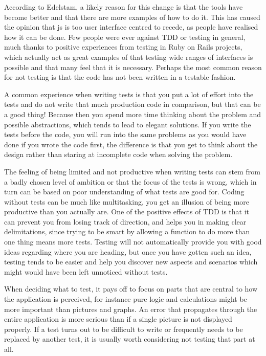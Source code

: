 \documentclass[11pt]{article}
\begin{document}
According to Edelstam, a likely reason for this change is that the tools have become better and that there are more examples of how to do it. This has caused the opinion that \gls{js} is too user interface centred to recede, as people have realised how it can be done. Few people were ever against TDD or testing in general, much thanks to positive experiences from testing in Ruby on Rails projects, which actually act as great examples of that testing wide ranges of interfaces is possible and that many feel that it is necessary. Perhaps the most common reason for not testing is that the code has not been written in a testable fashion. \cite[questions~2-3]{Edelstam}

A common experience when writing tests is that you put a lot of effort into the tests and do not write that much production code in comparison, but that can be a good thing! Because then you spend more time thinking about the problem and possible abstractions, which tends to lead to elegant solutions. If you write the tests before the code, you will run into the same problems as you would have done if you wrote the code first, the difference is that you get to think about the design rather than staring at incomplete code when solving the problem. \cite[question~8]{Edelstam}

The feeling of being limited and not productive when writing tests can stem from a badly chosen level of ambition or that the focus of the tests is wrong, which in turn can be based on poor understanding of what tests are good for. Coding without tests can be much like multitasking, you get an illusion of being more productive than you actually are. One of the positive effects of TDD is that it can prevent you from losing track of direction, and helps you in making clear delimitations, since trying to be smart by allowing a function to do more than one thing means more tests. Testing will not automatically provide you with good ideas regarding where you are heading, but once you have gotten such an idea, testing tends to be easier and help you discover new aspects and scenarios which might would have been left unnoticed without tests. \cite[question~8]{Edelstam}

When deciding what to test, it pays off to focus on parts that are central to how the application is perceived, for instance pure logic and calculations might be more important than pictures and graphs. An error that propagates through the entire application is more serious than if a single picture is not displayed properly. If a test turns out to be difficult to write or frequently needs to be replaced by another test, it is usually worth considering not testing that part at all. \cite[questions~9-10]{Edelstam}
\end{document}
